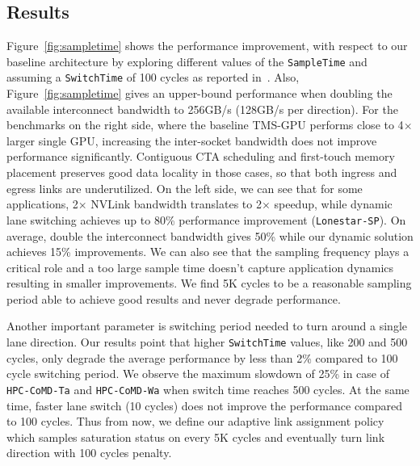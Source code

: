 \subsection{Results}
Figure~\ref{fig:sampletime} shows the performance improvement, with respect 
to our baseline architecture by exploring different values of the 
\texttt{SampleTime} and assuming a \texttt{SwitchTime} of 100 cycles as 
reported in~\cite{REALLY_NEED_REF_HERE}. Also, Figure~\ref{fig:sampletime} 
gives an upper-bound performance when doubling the available interconnect 
bandwidth to 256GB/s (128GB/s per direction). For the benchmarks on the right 
side, where the baseline TMS-GPU performs close to 4$\times$ larger single 
GPU, increasing the inter-socket bandwidth does not improve performance 
significantly. Contiguous CTA scheduling and first-touch memory placement 
preserves good data locality in those cases, so that both ingress and egress 
links are underutilized. On the left side, we can see that for some 
applications, 2$\times$ NVLink bandwidth translates to 2$\times$ speedup, 
while dynamic lane switching achieves up to 80\% performance improvement 
(\texttt{Lonestar-SP}). On average, double the interconnect bandwidth gives 
50\% while our dynamic solution achieves 15\% improvements. We can also see 
that the sampling frequency plays a critical role and a too large sample time 
doesn't capture application dynamics resulting in smaller improvements. We 
find 5K cycles to be a reasonable sampling period able to achieve good 
results and never degrade performance. 

Another important parameter is switching period needed to turn around a 
single lane direction. Our results point that higher \texttt{SwitchTime} 
values, like 200 and 500 cycles, only degrade the average performance by less 
than 2\% compared to 100 cycle switching period. We observe the maximum 
slowdown of 25\% in case of \texttt{HPC-CoMD-Ta} and \texttt{HPC-CoMD-Wa} 
when switch time reaches 500 cycles. At the same time, faster lane switch (10 
cycles) does not improve the performance compared to 100 cycles. Thus from 
now, we define our adaptive link assignment policy which samples saturation 
status on every 5K cycles and eventually turn link direction with 100 cycles 
penalty. 



